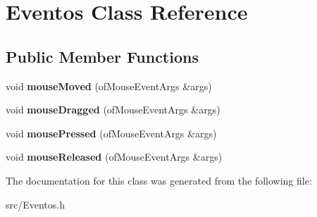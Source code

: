 \hypertarget{class_eventos}{}\section{Eventos Class Reference}
\label{class_eventos}
\subsection*{Public Member Functions}
\begin{DoxyCompactItemize}
\item 
\hypertarget{class_eventos_ac8d4829f20eaca707df6dce7f9663209}{}void {\bfseries mouse\+Moved} (of\+Mouse\+Event\+Args \&args)\label{class_eventos_ac8d4829f20eaca707df6dce7f9663209}

\item 
\hypertarget{class_eventos_a6bd88c1cc0d352f43f51daf44fd96f7a}{}void {\bfseries mouse\+Dragged} (of\+Mouse\+Event\+Args \&args)\label{class_eventos_a6bd88c1cc0d352f43f51daf44fd96f7a}

\item 
\hypertarget{class_eventos_a812871e62530f7a2e46aa9417e9171b1}{}void {\bfseries mouse\+Pressed} (of\+Mouse\+Event\+Args \&args)\label{class_eventos_a812871e62530f7a2e46aa9417e9171b1}

\item 
\hypertarget{class_eventos_ae1aa0eeaeb7696d795bbbebdd6978df5}{}void {\bfseries mouse\+Released} (of\+Mouse\+Event\+Args \&args)\label{class_eventos_ae1aa0eeaeb7696d795bbbebdd6978df5}

\end{DoxyCompactItemize}


The documentation for this class was generated from the following file\+:\begin{DoxyCompactItemize}
\item 
src/Eventos.\+h\end{DoxyCompactItemize}
